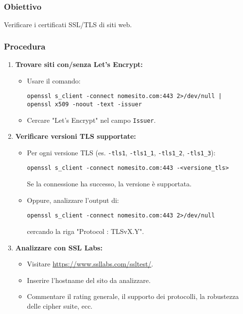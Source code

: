 \subsubsection{Obiettivo}
Verificare i certificati SSL/TLS di siti web.

\subsubsection{Procedura}
\begin{enumerate}
    \item \textbf{Trovare siti con/senza Let's Encrypt:}
    \begin{itemize}
        \item Usare il comando:
        \begin{verbatim}
openssl s_client -connect nomesito.com:443 2>/dev/null | openssl x509 -noout -text -issuer
        \end{verbatim}
        \item Cercare "Let's Encrypt" nel campo \texttt{Issuer}.
    \end{itemize}
    \item \textbf{Verificare versioni TLS supportate:}
    \begin{itemize}
        \item Per ogni versione TLS (es. \texttt{-tls1}, \texttt{-tls1\_1}, \texttt{-tls1\_2}, \texttt{-tls1\_3}):
        \begin{verbatim}
openssl s_client -connect nomesito.com:443 -<versione_tls>
        \end{verbatim}
        Se la connessione ha successo, la versione è supportata.
        \item Oppure, analizzare l'output di:
        \begin{verbatim}
openssl s_client -connect nomesito.com:443 2>/dev/null
        \end{verbatim}
        cercando la riga "Protocol : TLSvX.Y".
    \end{itemize}
    \item \textbf{Analizzare con SSL Labs:}
    \begin{itemize}
        \item Visitare \url{https://www.ssllabs.com/ssltest/}.
        \item Inserire l'hostname del sito da analizzare.
        \item Commentare il rating generale, il supporto dei protocolli, la robustezza delle cipher suite, ecc.
    \end{itemize}
\end{enumerate}


